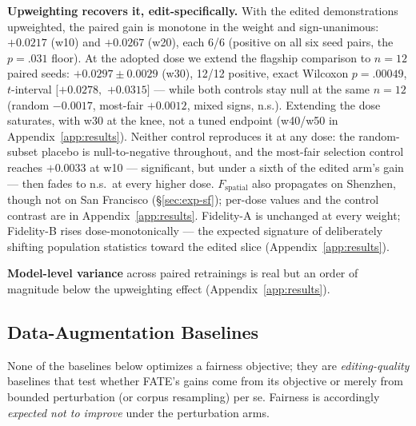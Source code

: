 \textbf{Upweighting recovers it, edit-specifically.} With the edited
demonstrations upweighted, the paired gain is monotone in the weight and
sign-unanimous: $+0.0217$ (w10) and $+0.0267$ (w20), each 6/6
(positive on all six seed pairs, the $p = .031$ floor). At the adopted dose we extend the flagship comparison to
$n = 12$ paired seeds: $+0.0297 \pm 0.0029$ (w30), 12/12 positive, exact
Wilcoxon $p = .00049$, $t$-interval $[+0.0278,$ $+0.0315]$ --- while both %
controls stay null at the same $n = 12$ (random $-0.0017$, most-fair
$+0.0012$, mixed signs, n.s.).
Extending the dose saturates, with w30 at the knee, not a tuned endpoint
(w40/w50 in Appendix~\ref{app:results}). Neither
control reproduces it at any dose: the random-subset placebo is
null-to-negative throughout, and the most-fair selection control reaches
$+0.0033$ at w10 --- significant, but under a sixth of the edited arm's
gain --- then fades to n.s.\ at every higher dose. $F_{\mathrm{spatial}}$ also propagates
on Shenzhen, though not on San Francisco (\S\ref{sec:exp-sf}); per-dose
values and the control contrast are in Appendix~\ref{app:results}. Fidelity-A is unchanged at every weight;
Fidelity-B rises dose-monotonically --- the expected signature of deliberately
shifting population statistics toward the edited slice (Appendix~\ref{app:results}).

\textbf{Model-level variance} across paired retrainings is real but an order
of magnitude below the upweighting effect (Appendix~\ref{app:results}).


\subsection{Data-Augmentation Baselines}\label{sec:exp-baselines}
None of the baselines below optimizes a fairness objective; they are
\emph{editing-quality} baselines that test whether FATE's gains come from
its objective or merely from bounded perturbation (or corpus resampling)
per se. Fairness is accordingly \emph{expected not to improve} under the
perturbation arms.

